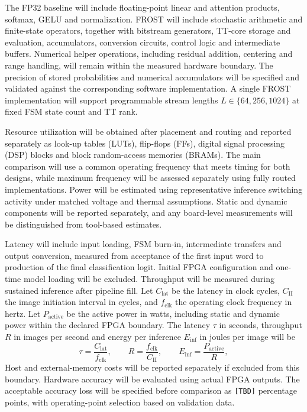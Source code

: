 \documentclass[pdflatex,sn-mathphys-num]{sn-jnl}
\theoremstyle{thmstyleone}
\theoremstyle{thmstyletwo}
\theoremstyle{thmstylethree}
\begin{document}
The FP32 baseline will include floating-point linear and attention products, softmax, GELU and normalization. FROST will include stochastic arithmetic and finite-state operators, together with bitstream generators, TT-core storage and evaluation, accumulators, conversion circuits, control logic and intermediate buffers. Numerical helper operations,
including residual addition, centering and range handling, will remain within the measured hardware boundary. The precision of stored probabilities and numerical accumulators will be specified and validated against the corresponding software implementation. A single FROST
implementation will support programmable stream lengths $L\in\{64,256,1024\}$ at fixed FSM state count and TT rank.

Resource utilization will be obtained after placement and routing and reported separately as look-up tables (LUTs), flip-flops (FFs), digital signal processing (DSP) blocks and block random-access memories (BRAMs). The main comparison will use a common operating frequency that meets timing for both designs, while maximum frequency will be assessed separately using fully routed implementations. Power will be estimated using representative inference switching activity under matched voltage and thermal assumptions. Static and dynamic components will be reported separately, and any board-level measurements will be distinguished
from tool-based estimates.

Latency will include input loading, FSM burn-in, intermediate transfers and output conversion, measured from acceptance of the first input word to production of the final classification logit. Initial FPGA configuration and one-time model loading will be excluded. Throughput will be measured during sustained inference after pipeline fill. Let $C_{\mathrm{lat}}$ be the latency in clock cycles, $C_{\mathrm{II}}$ the image initiation interval in cycles, and $f_{\mathrm{clk}}$ the operating clock frequency in hertz. Let $P_{\mathrm{active}}$ be the active power in watts, including static and dynamic power within the declared FPGA boundary. The latency $\tau$ in seconds, throughput $R$ in images per second and energy per inference $E_{\mathrm{inf}}$ in joules per image will be
\begin{equation}
\tau = \frac{C_{\mathrm{lat}}}{f_{\mathrm{clk}}}, \qquad R = \frac{f_{\mathrm{clk}}}{C_{\mathrm{II}}}, \qquad E_{\mathrm{inf}} = \frac{P_{\mathrm{active}}}{R}, \label{eq:fpga_metrics}
\end{equation}
Host and external-memory costs will be reported separately if excluded from this boundary. Hardware accuracy will be evaluated using actual FPGA outputs. The acceptable accuracy loss will be specified before comparison as \texttt{[TBD]} percentage
points, with operating-point selection based on validation data.
\end{document}
